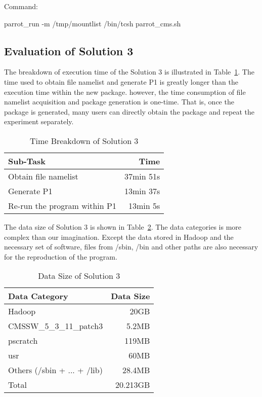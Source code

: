 \documentclass{acm_proc_article-sp}
\begin{document}
Command:

parrot\_run -m /tmp/mountlist /bin/tcsh parrot\_cms.sh

\subsection{Evaluation of Solution 3}
The breakdown of execution time of the Solution 3 is illustrated in Table~\ref{table:time-3rd}. The time used to obtain file namelist and generate P1 is greatly longer than the execution time within the new package. however, the time consumption of file namelist acquisition and package generation is one-time. That is, once the package is generated, many users can directly obtain the package and repeat the experiment separately. 

\begin{table}
    \centering
    \begin{tabular}{|l|r|}
    \hline
    Sub-Task & Time \\ \hline
    Obtain file namelist & 37min 51s \\ \hline
    Generate P1 & 13min 37s \\ \hline
    Re-run the program within P1 & 13min 5s \\ \hline
    \end{tabular}
    \caption{Time Breakdown of Solution 3}
    \label{table:time-3rd}
\end{table}

The data size of Solution 3 is shown in Table~\ref{table:datasize-3rd}. The data categories is more complex than our imagination. Except the data stored in Hadoop and the necessary set of software, files from /sbin, /bin and other paths are also necessary for the reproduction of the program.

\begin{table}
    \centering
    \begin{tabular}{|l|r|}
    \hline
    Data Category & Data Size \\ \hline
    Hadoop & 20GB \\ \hline
    CMSSW\_5\_3\_11\_patch3 & 5.2MB \\ \hline
    pscratch & 119MB \\ \hline
    usr & 60MB \\ \hline
    Others (/sbin + ... + /lib) & 28.4MB \\ \hline
    Total & 20.213GB \\ \hline
    \end{tabular}
    \caption{Data Size of Solution 3}
    \label{table:datasize-3rd}
\end{table}    
\end{document}

